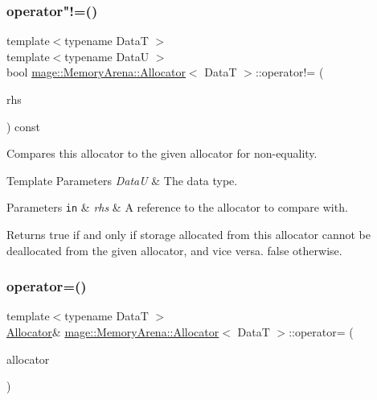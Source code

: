 \subsubsection{\texorpdfstring{operator"!=()}{operator!=()}}
{\footnotesize\ttfamily template$<$typename DataT $>$ \\
template$<$typename DataU $>$ \\
bool \hyperlink{structmage_1_1_memory_arena_1_1_allocator}{mage\+::\+Memory\+Arena\+::\+Allocator}$<$ DataT $>$\+::operator!= (\begin{DoxyParamCaption}\item[{const \hyperlink{structmage_1_1_memory_arena_1_1_allocator}{Allocator}$<$ DataU $>$ \&}]{rhs }\end{DoxyParamCaption}) const\hspace{0.3cm}{\ttfamily [noexcept]}}

Compares this allocator to the given allocator for non-\/equality.


\begin{DoxyTemplParams}{Template Parameters}
{\em DataU} & The data type. \\
\hline
\end{DoxyTemplParams}

\begin{DoxyParams}[1]{Parameters}
\mbox{\tt in}  & {\em rhs} & A reference to the allocator to compare with. \\
\hline
\end{DoxyParams}
\begin{DoxyReturn}{Returns}
{\ttfamily true} if and only if storage allocated from this allocator cannot be deallocated from the given allocator, and vice versa. {\ttfamily false} otherwise. 
\end{DoxyReturn}
\hypertarget{structmage_1_1_memory_arena_1_1_allocator_a9774e6cb2e1f8ac94ee9f6a7be4f561a}{}\label{structmage_1_1_memory_arena_1_1_allocator_a9774e6cb2e1f8ac94ee9f6a7be4f561a} 
\subsubsection{\texorpdfstring{operator=()}{operator=()}\hspace{0.1cm}{\footnotesize\ttfamily [1/2]}}
{\footnotesize\ttfamily template$<$typename DataT $>$ \\
\hyperlink{structmage_1_1_memory_arena_1_1_allocator}{Allocator}\& \hyperlink{structmage_1_1_memory_arena_1_1_allocator}{mage\+::\+Memory\+Arena\+::\+Allocator}$<$ DataT $>$\+::operator= (\begin{DoxyParamCaption}\item[{const \hyperlink{structmage_1_1_memory_arena_1_1_allocator}{Allocator}$<$ DataT $>$ \&}]{allocator }\end{DoxyParamCaption})\hspace{0.3cm}{\ttfamily [delete]}}

